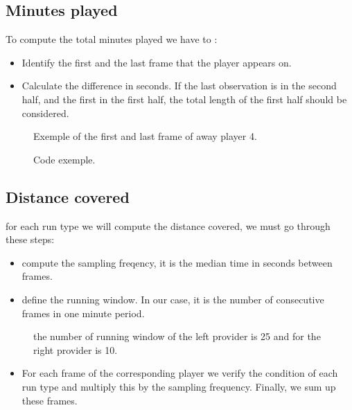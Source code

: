 \documentclass[letterpaper,10pt,english]{jupyterBook}
\begin{document}
\subsection{Minutes played}
\label{\detokenize{Chap2/chap2:minutes-played}}
\sphinxAtStartPar
To compute the total minutes played we have to :
\begin{itemize}
\item {} 
\sphinxAtStartPar
Identify the first and the last frame that the player appears on.

\item {} 
\sphinxAtStartPar
Calculate the difference in seconds. If the last observation is in the second half, and the first in the first half, the total length of the first half should be considered.

\end{itemize}

\begin{figure}[htbp]
\centering
\capstart

\noindent{}
\caption{Exemple of the first and last frame of away player 4.}\label{\detokenize{Chap2/chap2:minutes-fig}}\end{figure}

\begin{figure}[htbp]
\centering
\capstart

\noindent{}
\caption{Code exemple.}\label{\detokenize{Chap2/chap2:codeminutes-fig}}\end{figure}


\subsection{Distance covered}
\label{\detokenize{Chap2/chap2:distance-covered}}
\sphinxAtStartPar
for each run type we will compute the distance covered, we must go through these steps:
\begin{itemize}
\item {} 
\sphinxAtStartPar
compute the sampling freqency, it is the median time in seconds between frames.

\item {} 
\sphinxAtStartPar
define the running window. In our case, it is the number of consecutive frames in one minute period.

\end{itemize}

\begin{figure}[htbp]
\centering
\capstart

\noindent{}
\caption{the number of running window of the left provider is 25 and for the right provider is 10.}\label{\detokenize{Chap2/chap2:rw-fig}}\end{figure}
\begin{itemize}
\item {} 
\sphinxAtStartPar
For each frame of the corresponding player we verify the condition of each run type and multiply this by the sampling frequency. Finally, we sum up these frames.

\end{itemize}
\end{document}
